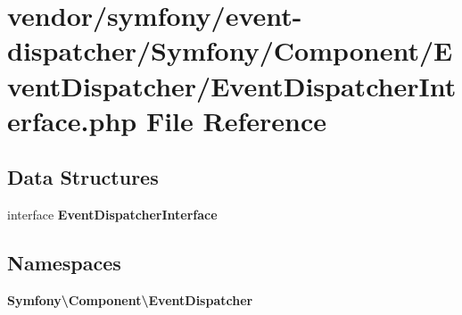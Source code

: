 \section{vendor/symfony/event-\/dispatcher/\+Symfony/\+Component/\+Event\+Dispatcher/\+Event\+Dispatcher\+Interface.php File Reference}
\label{_event_dispatcher_interface_8php}
\subsection*{Data Structures}
\begin{DoxyCompactItemize}
\item 
interface {\bf Event\+Dispatcher\+Interface}
\end{DoxyCompactItemize}
\subsection*{Namespaces}
\begin{DoxyCompactItemize}
\item 
 {\bf Symfony\textbackslash{}\+Component\textbackslash{}\+Event\+Dispatcher}
\end{DoxyCompactItemize}
